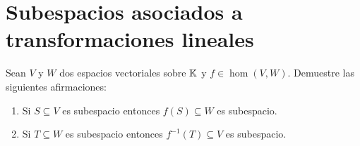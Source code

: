 %
%

\section{Subespacios asociados a transformaciones lineales}

\begin{xca}
	\label{xca:imagen_y_preimagen}
	Sean $V$ y $W$ dos espacios vectoriales sobre $\mathbb{K}$ y $f\in\hom(V,W)$.
	Demuestre las siguientes afirmaciones:
	\begin{enumerate}
		\item Si $S\subseteq V$ es subespacio entonces $f(S)\subseteq W$ es
			subespacio. 
		\item Si $T\subseteq W$ es subespacio entonces $f^{-1}(T)\subseteq V$ es
			subespacio. 
	\end{enumerate}
\end{xca}

